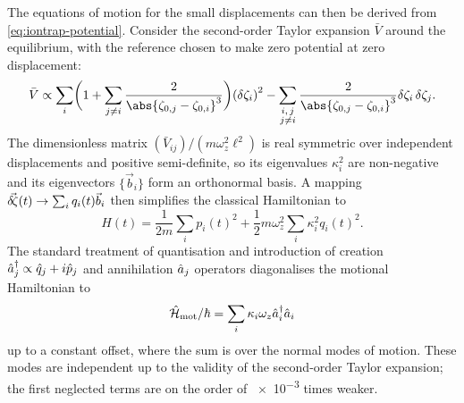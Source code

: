 The equations of motion for the small displacements can then be derived from \cref{eq:iontrap-potential}.
Consider the second-order Taylor expansion $\bar V$ around the equilibrium, with the reference chosen to make zero potential at zero displacement:
\begin{equation}
\bar V
    \propto \sum_i \biggl(1 + \sum_{j\ne i}\frac2{{\abs{\zeta_{0,j} - \zeta_{0,i}}}^3}\biggr){(\delta\zeta_i)}^2
        - \sum_{\substack{i,\,j\\j\ne i}} \frac2{{\abs{\zeta_{0,j} - \zeta_{0,i}}}^3}\delta\zeta_i\,\delta\zeta_j.
\end{equation}
The dimensionless matrix $(\bar V_{ij}) / (m\omega_z^2\ell^2)$ is real symmetric over independent displacements and positive semi-definite, so its eigenvalues $\kappa_i^2$ are non-negative and its eigenvectors $\{\vec b_i\}$ form an orthonormal basis.
A mapping $\vec{\delta\mkern-2mu\zeta}(t) \to \sum_i q_i(t)\vec b_i$ then simplifies the classical Hamiltonian to 
\begin{equation}\label{eq:iontrap-classical-motional-hamiltonian}
H(t) = \frac1{2m}\sum_i {p_i(t)}^2 + \frac12m\omega_z^2\sum_i \kappa_i^2{q_i(t)}^2.
\end{equation}
The standard treatment of quantisation and introduction of creation $\hat{a}_j^\dagger \propto \hat{q}_j + i\hat{p}_j$ and annihilation $\hat{a}_j$ operators diagonalises the motional Hamiltonian to
\begin{equation}\label{eq:iontrap-motional-hamiltonian}
\hat{\mathcal H}_{\text{mot}}/\hbar = \sum_i \kappa_i\omega_z\hat{a}_i^\dagger\hat{a}_i
\end{equation}
up to a constant offset, where the sum is over the normal modes of motion.
These modes are independent up to the validity of the second-order Taylor expansion; the first neglected terms are on the order of \num{e-3} times weaker.

